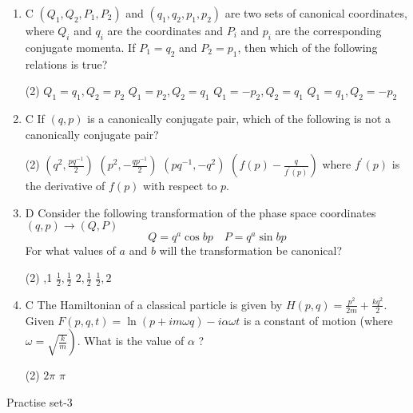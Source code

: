 \begin{enumerate}
\begin{tasks}
	\end{tasks}
	\item C $\left(Q_{1}, Q_{2}, P_{1}, P_{2}\right)$ and $\left(q_{1}, q_{2}, p_{1}, p_{2}\right)$ are two sets of canonical coordinates, where $Q_{i}$ and $q_{i}$ are the coordinates and $P_{i}$ and $p_{i}$ are the corresponding conjugate momenta. If $P_{1}=q_{2}$ and $P_{2}=p_{1}$, then which of the following relations is true?
	{}
	 \begin{tasks}(2)
		\task[\textbf{a.}]$Q_{1}=q_{1}, Q_{2}=p_{2}$
		\task[\textbf{b.}]$Q_{1}=p_{2}, Q_{2}=q_{1}$
		\task[\textbf{c.}]$Q_{1}=-p_{2}, Q_{2}=q_{1}$
		\task[\textbf{d.}] $Q_{1}=q_{1}, Q_{2}=-p_{2}$
	\end{tasks}
	\item C If $(q, p)$ is a canonically conjugate pair, which of the following is not a canonically conjugate pair?
{}
	 \begin{tasks}(2)
		\task[\textbf{a.}] $\left(q^{2}, \frac{p q^{-1}}{2}\right)$
		\task[\textbf{b.}]$\left(p^{2},-\frac{q p^{-1}}{2}\right)$
		\task[\textbf{c.}] $\left(p q^{-1},-q^{2}\right)$
		\task[\textbf{d.}] $\left(f(p)-\frac{q}{f^{\prime}(p)}\right)$ where $f^{\prime}(p)$ is the derivative of $f(p)$ with respect to $p$.
	\end{tasks}
	\item D Consider the following transformation of the phase space coordinates $(q, p) \rightarrow(Q, P)$
	$$
	Q=q^{a} \cos b p \quad P=q^{a} \sin b p
	$$
	For what values of $a$ and $b$ will the transformation be canonical?
{}
	 \begin{tasks}(2)
		,1
		\task[\textbf{b.}] $\frac{1}{2}, \frac{1}{2}$
		\task[\textbf{c.}]$2, \frac{1}{2}$
		\task[\textbf{d.}] $\frac{1}{2}, 2$
	\end{tasks}
	\item C The Hamiltonian of a classical particle is given by $H(p, q)=\frac{p^{2}}{2 m}+\frac{k q^{2}}{2}$. Given $F(p, q, t)=\ln (p+i m \omega q)-i \alpha \omega t$ is a constant of motion (where $\left.\omega=\sqrt{\frac{k}{m}}\right)$. What is the value of $\alpha$ ?
{}
	 \begin{tasks}(2)
		\task[\textbf{a.}]$2 \pi$
		\task[\textbf{d.}]  $\pi$
	\end{tasks}
\end{enumerate}
\newpage
\begin{abox}
	Practise set-3
\end{abox}
